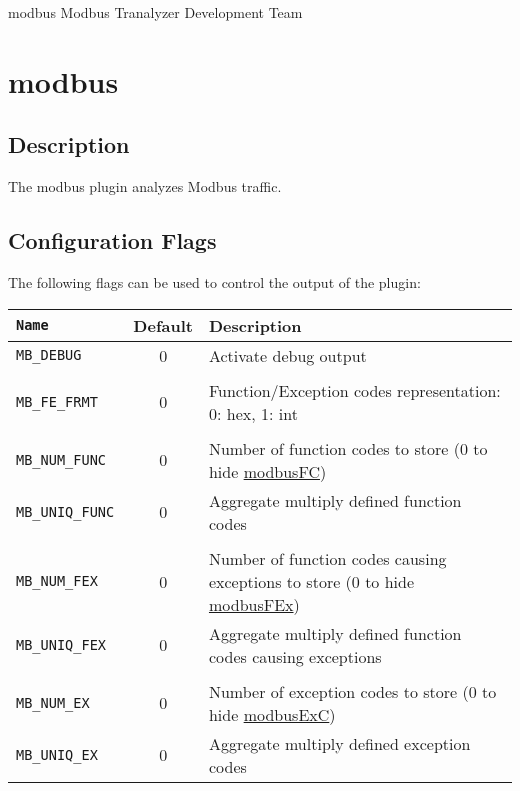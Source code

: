 \documentclass[documentation]{subfiles}
\begin{document}
\trantitle
    {modbus} %
    {Modbus} %
    {Tranalyzer Development Team} %

\section{modbus}\label{s:modbus}

\subsection{Description}
The modbus plugin analyzes Modbus traffic.

\subsection{Configuration Flags}
The following flags can be used to control the output of the plugin:
\begin{longtable}{>{\tt}lcl}
    \toprule
    {\bf Name} & {\bf Default} & {\bf Description}\\
    \midrule\endhead%
    MB\_DEBUG      & 0 & Activate debug output\\
    \\
    MB\_FE\_FRMT   & 0 & Function/Exception codes representation: 0: hex, 1: int\\
    \\
    MB\_NUM\_FUNC  & 0 & Number of function codes to store (0 to hide \hyperref[modbusFC]{modbusFC})\\
    MB\_UNIQ\_FUNC & 0 & Aggregate multiply defined function codes\\
    \\
    MB\_NUM\_FEX   & 0 & Number of function codes causing exceptions to store (0 to hide \hyperref[modbusFEx]{modbusFEx})\\
    MB\_UNIQ\_FEX  & 0 & Aggregate multiply defined function codes causing exceptions\\
    \\
    MB\_NUM\_EX    & 0 & Number of exception codes to store (0 to hide \hyperref[modbusExC]{modbusExC})\\
    MB\_UNIQ\_EX   & 0 & Aggregate multiply defined exception codes\\
    \bottomrule
\end{longtable}
\end{document}
